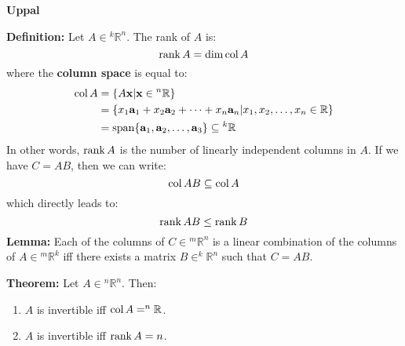 \documentclass{article}
\begin{document}
    \begin{minipage}[t]{.45\textwidth} %
        \begin{center}
            \textbf{Uppal}
        \end{center}
        \textbf{Definition:} Let $A \in {^k}\mathbb{R}^n$. The rank of $A$ is:
        \begin{equation*}
            \rank A = \dim \mathrm{col}\,A
        \end{equation*}
        where the \textbf{column space} is equal to:
        \begin{align*}
            \mathrm{col}\,A &= \{A\mathbf{x} | \mathbf{x} \in {^n}\mathbb{R}\} \\
                   &= \{x_1\mathbf{a}_1 + x_2\mathbf{a}_2 + \cdots + x_n\mathbf{a}_n | x_1,x_2,\dots,x_n \in \mathbb{R}\} \\
                   &= \mathrm{span}\{\mathbf{a}_1,\mathbf{a}_2,\dots,\mathbf{a}_3\}  \subseteq {^k}\mathbb{R}
        \end{align*}
        In other words, $\rank A$ is the number of linearly independent columns in $A$. If we have $C=AB$, then we can write:
        \begin{equation*}
            \mathrm{col}\,AB \subseteq \mathrm{col}\,A
        \end{equation*}
        which directly leads to:
        \begin{equation*}
            \rank AB \le \rank B
        \end{equation*}
        \textbf{Lemma:} Each of the columns of $C \in {^m}\mathbb{R}^n$ is a linear combination of the columns of $A \in {^m}\mathbb{R}^k$ iff there exists a matrix $B \in ^k\mathbb{R}^n$ such that $C=AB$.
        \vspace{2mm}

        \textbf{Theorem:} Let $A \in {^n}\mathbb{R}^n$. Then:
        \begin{enumerate}
            \item $A$ is invertible iff $\mathrm{col}\,A = ^n\mathbb{R}$.
            \item $A$ is invertible iff $\rank A = n$.
        \end{enumerate}
        \vspace{2mm}


\end{minipage}
\end{document}
